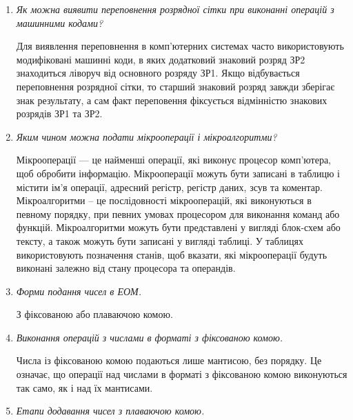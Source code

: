 \documentclass[12pt,a4paper]{article}
\begin{document}
\begin{enumerate}
        \item \textit{Як можна виявити переповнення розрядної сітки при виконанні операцій з машинними кодами?}
        
        Для виявлення переповнення в комп'ютерних системах часто використовують модифіковані машинні коди, в яких додатковий знаковий розряд ЗР2 знаходиться ліворуч від основного розряду ЗР1.
        Якщо відбувається переповнення розрядної сітки, то старший знаковий розряд завжди зберігає знак результату, а сам факт переповення фіксується відмінністю знакових розрядів ЗР1 та ЗР2.

        \vspace{1em}

        \item \textit{Яким чином можна подати мікрооперації і мікроалгоритми?}
        
        Мікрооперації --- це найменші операції, які виконує процесор комп'ютера, щоб обробити інформацію.
        Мікрооперації можуть бути записані в таблицю і містити ім'я операції, адресний регістр, регістр даних, зсув та коментар.
        Мікроалгоритми – це послідовності мікрооперацій, які виконуються в певному порядку, при певних умовах процесором для виконання команд або функцій.
        Мікроалгоритми можуть бути представлені у вигляді блок-схем або тексту, а також можуть бути записані у вигляді таблиці.
        У таблицях використовують позначення станів, щоб вказати, які мікрооперації будуть виконані залежно від стану процесора та операндів.

        \vspace{1em}
    
        \item \textit{Форми подання чисел в ЕОМ.}
        
        З фіксованою або плаваючою комою.
        \vspace{1em}

        \item \textit{Виконання операцій з числами в форматі з фіксованою комою.}
        
        Числа із фіксованою комою подаються лише мантисою, без порядку. Це означає, що операції над числами в форматі з фіксованою комою виконуються так само, як і над їх мантисами.

        \vspace{1em}

        \item \textit{Етапи додавання чисел з плаваючою комою.}
        

\end{enumerate}
\end{document}
